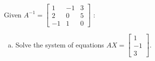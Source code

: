 \documentclass[../main.tex]{subfiles}
\begin{document}
Given
$A^{-1} = 
\left[\begin{array}{rrr}
	1 & -1 & 3 \\
	2 & 0 & 5 \\
	-1 & 1 & 0
\end{array}\right]$
:
\begin{enumerate}[a)]
	\item Solve the system of equations
		$
			AX =
			\left[\begin{array}{rrr}
				1 \\
				-1 \\
				3
			\end{array}\right]
		$.
\end{enumerate}
\end{document}
